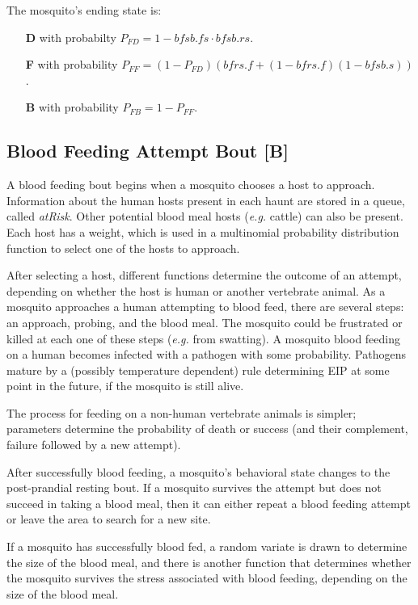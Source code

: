 \documentclass{article}
\newcommand{\eg}{{\em e.g. }}
\begin{document}
The mosquito's ending state is: 

\begin{itemize}
\item[{\bf D}] with probabilty $P_{FD} = 1 - bfsb.fs \cdot bfsb.rs $.  
\item[{\bf F}] with probability $P_{FF} = (1-P_{FD}) (bfrs.f + (1-bfrs.f)(1-bfsb.s))$.
\item[{\bf B}] with probability $P_{FB} = 1-P_{FF}$. 
\end{itemize}

\subsection{Blood Feeding Attempt Bout [B]}

A blood feeding bout begins when a mosquito chooses a host to approach. Information about the human hosts present in each haunt are stored in a queue, called {\em atRisk}. Other potential blood meal hosts (\eg cattle) can also be present. Each host has a weight, which is used in a multinomial probability distribution function to select one of the hosts to approach. 

After selecting a host, different functions determine the outcome of an attempt, depending on whether the host is human or another vertebrate animal. As a mosquito approaches a human attempting to blood feed, there are several steps: an approach, probing, and the blood meal. The mosquito could be frustrated or killed at each one of these steps (\eg from swatting). A mosquito blood feeding on a human becomes infected with a pathogen with some probability. Pathogens mature by a (possibly temperature dependent) rule determining EIP at some point in the future, if the mosquito is still alive. 

The process for feeding on a non-human vertebrate animals is simpler; parameters determine the probability of death or success (and their complement, failure followed by a new attempt). 

After successfully blood feeding, a mosquito's behavioral state changes to the post-prandial resting bout. If a mosquito survives the attempt but does not succeed in taking a blood meal, then it can either repeat a blood feeding attempt or leave the area to search for a new site.  

If a mosquito has successfully blood fed, a random variate is drawn to determine the size of the blood meal, and there is another function that determines whether the mosquito survives the stress associated with blood feeding, depending on the size of the blood meal.
\end{document}
